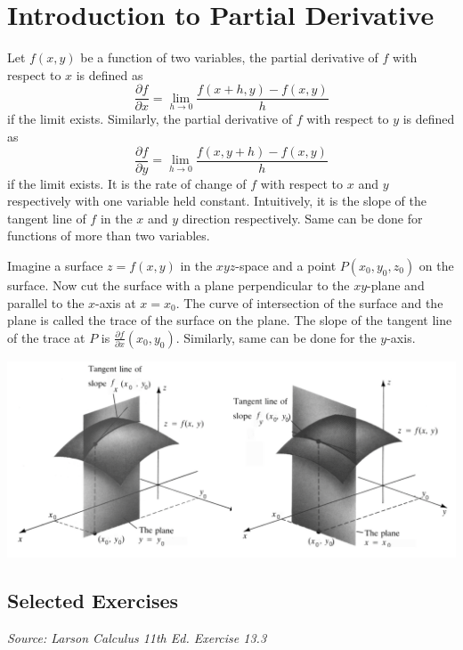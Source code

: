 \chapter {Introduction to Partial Derivative}

Let $f(x, y)$ be a function of two variables, the partial derivative of $f$
with respect to $x$ is defined as \[\frac{\partial f}{\partial x} = \lim_{h \to 0} \frac{f(x + h, y) - f(x, y)}{h}\] if the limit exists. Similarly, the partial derivative of $f$ with respect to
$y$ is defined as \[\frac{\partial f}{\partial y} = \lim_{h \to 0} \frac{f(x, y + h) - f(x, y)}{h}\] if the limit exists. It is the rate of change of $f$ with respect to $x$ and
$y$ respectively with one variable held constant. Intuitively, it is the slope
of the tangent line of $f$ in the $x$ and $y$ direction respectively. Same can
be done for functions of more than two variables.

Imagine a surface $z = f(x, y)$ in the $xyz$-space and a point $P(x_0, y_0,
    z_0)$ on the surface. Now cut the surface with a plane perpendicular to the
$xy$-plane and parallel to the $x$-axis at $x = x_0$. The curve of intersection
of the surface and the plane is called the trace of the surface on the plane.
The slope of the tangent line of the trace at $P$ is $\frac{\partial f}{\partial x}(x_0, y_0)$. Similarly, same can be done for the $y$-axis.

\begin{center}
    \includegraphics[scale=0.15]{assets/Partial Derivative.png}
\end{center}

\newpage
\section*{Selected Exercises}
\textit{Source: Larson Calculus 11th Ed. Exercise 13.3}

